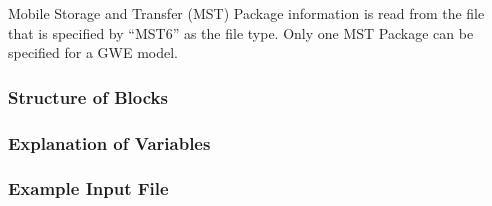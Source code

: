 Mobile Storage and Transfer (MST) Package information is read from the file that is specified by ``MST6'' as the file type.  Only one MST Package can be specified for a GWE model. 

\vspace{5mm}
\subsubsection{Structure of Blocks}



\vspace{5mm}
\subsubsection{Explanation of Variables}
\begin{description}

\end{description}

\vspace{5mm}
\subsubsection{Example Input File}



